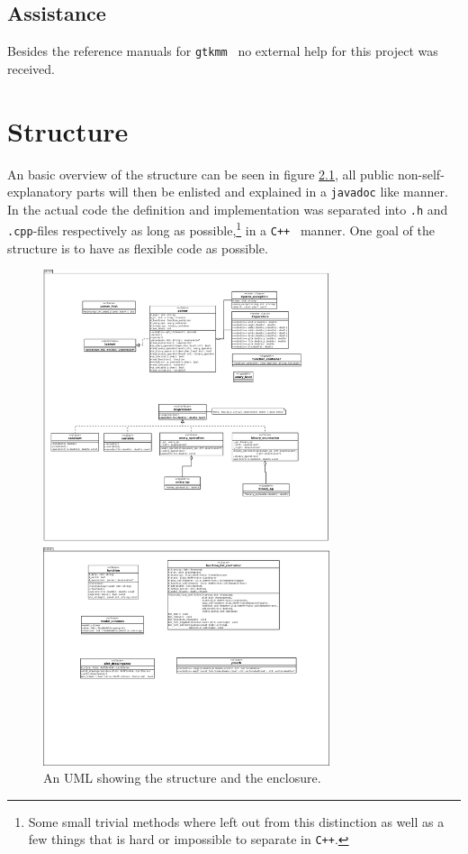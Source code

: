 \documentclass[a4paper,11pt]{kth-mag}
\newcommand{\Cpp}{\texttt{C++}}
\newcommand{\Gtkmm}{\texttt{gtkmm}}
\begin{document}
\section{Assistance}
Besides the reference manuals for \Gtkmm ~ no external help for this project was
received.

\chapter{Structure}
An basic overview of the structure can be seen in figure \ref{fig:UML}, all
public non-self-explanatory parts will then be enlisted and explained in 
a \verb+javadoc+ like manner. In the actual code the definition and
implementation was separated into \texttt{.h} and \texttt{.cpp}-files
respectively as long as possible,\footnote{Some small trivial methods where
left out from this distinction as well as a few things that is hard or
impossible to separate in \Cpp.} in a \Cpp~ manner. One goal of the structure
is to have as flexible code as possible.
\begin{figure}[ht]
\begin{center}
    \includegraphics[width=0.75\textwidth]{uml.pdf}
    \caption{\small{An UML showing the structure and the enclosure.}}\label{fig:UML}
\end{center}
\end{figure}
\end{document}
